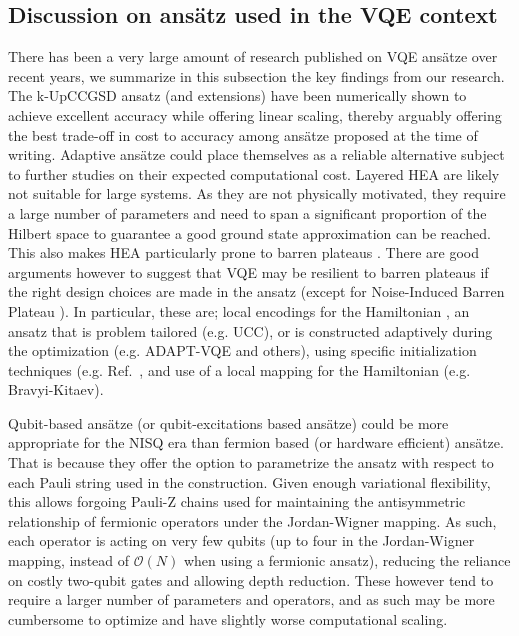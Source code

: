 \subsection{Discussion on ans\"atz used in the VQE context} \label{sec:ansatz_discussion}

There has been a very large amount of research published on VQE ans{\"{a}}tze over recent years, we summarize in this subsection the key findings from our research. The k-UpCCGSD ansatz \cite{Lee2019} (and extensions) have been numerically shown to achieve excellent accuracy while offering linear scaling, thereby arguably offering the best trade-off in cost to accuracy among ans\"atze proposed at the time of writing. Adaptive ans{\"{a}}tze could place themselves as a reliable alternative subject to further studies on their expected computational cost.
Layered HEA are likely not suitable for large systems. As they are not physically motivated, they require a large number of parameters and need to span a significant proportion of the Hilbert space to guarantee a good ground state approximation can be reached. This also makes HEA particularly prone to barren plateaus \cite{Holmes2021}. There are good arguments however to suggest that VQE may be resilient to barren plateaus if the right design choices are made in the ansatz (except for Noise-Induced Barren Plateau \cite{Wang2020}). In particular, these are; local encodings for the Hamiltonian \cite{Cerezo2021_BP, Uvarov2020}, an ansatz that is problem tailored (e.g. UCC), or is constructed adaptively during the optimization (e.g. ADAPT-VQE \cite{Grimsley2019} and others), using specific initialization techniques (e.g. Ref.~\cite{Grant2019, Patti2021}, and use of a local mapping for the Hamiltonian (e.g. Bravyi-Kitaev).

Qubit-based ans{\"{a}}tze \cite{Ryabinkin2018, Ryabinkin2020, Lang2020} (or qubit-excitations based ans{\"{a}}tze) could be more appropriate for the NISQ era than fermion based (or hardware efficient) ans{\"{a}}tze. That is because they offer the option to parametrize the ansatz with respect to each Pauli string used in the construction. Given enough variational flexibility, this allows forgoing Pauli-Z chains used for maintaining the antisymmetric relationship of fermionic operators under the Jordan-Wigner mapping. As such, each operator is acting on very few qubits (up to four in the Jordan-Wigner mapping, instead of $\mathcal{O}(N)$ when using a fermionic ansatz), reducing the reliance on costly two-qubit gates and allowing depth reduction. These however tend to require a larger number of parameters and operators, and as such may be more cumbersome to optimize and have slightly worse computational scaling.

